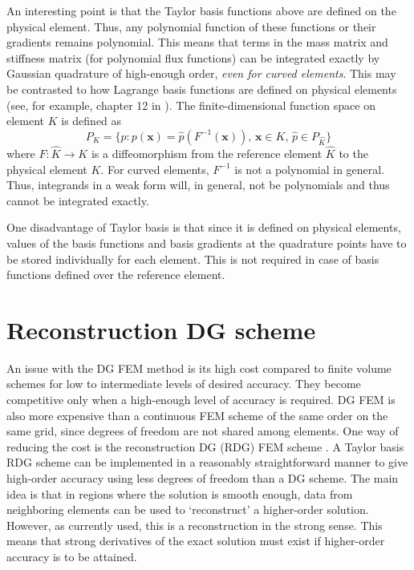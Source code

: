 \documentclass[11pt]{article}
\let\bld\boldsymbol
\begin{document}
An interesting point is that the Taylor basis functions above are defined on the physical element. Thus, any polynomial function of these functions or their gradients remains polynomial. This means that terms in the mass matrix and stiffness matrix (for polynomial flux functions) can be integrated exactly by Gaussian quadrature of high-enough order, \emph{even for curved elements}. This may be contrasted to how Lagrange basis functions are defined on physical elements (see, for example, chapter 12 in \cite{claesjohnson}). The finite-dimensional function space on element $K$ is defined as
\begin{equation}
P_K = \{ p: p(\bld{x}) = \hat{p}(F^{-1}(\bld{x})),\, \bld{x} \in K,\, \hat{p} \in P_{\hat{K}} \}
\end{equation}
where $F:\hat{K}\rightarrow K$ is a diffeomorphism from the reference element $\hat{K}$ to the physical element $K$. For curved elements, $F^{-1}$ is not a polynomial in general. Thus, integrands in a weak form will, in general, not be polynomials and thus cannot be integrated exactly.

One disadvantage of Taylor basis is that since it is defined on physical elements, values of the basis functions and basis gradients at the quadrature points have to be stored individually for each element. This is not required in case of basis functions defined over the reference element.

\section{Reconstruction DG scheme}
An issue with the DG FEM method is its high cost compared to finite volume schemes for low to intermediate levels of desired accuracy. They become competitive only when a high-enough level of accuracy is required. DG FEM is also more expensive than a continuous FEM scheme of the same order on the same grid, since degrees of freedom are not shared among elements. One way of reducing the cost is the reconstruction DG (RDG) FEM scheme \cite{luo_rdg}. A Taylor basis RDG scheme can be implemented in a reasonably straightforward manner to give high-order accuracy using less degrees of freedom than a DG scheme. The main idea is that in regions where the solution is smooth enough, data from neighboring elements can be used to `reconstruct' a higher-order solution. However, as currently used, this is a reconstruction in the strong sense. This means that strong derivatives of the exact solution must exist if higher-order accuracy is to be attained.
\end{document}
